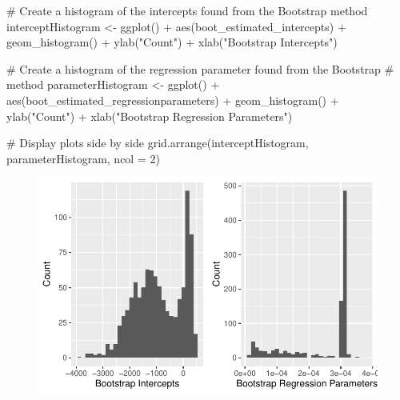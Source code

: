 \documentclass[
  letterpaper,
  DIV=11,
  numbers=noendperiod]{scrartcl}
\newenvironment{Shaded}{\begin{snugshade}}{\end{snugshade}}
\newcommand{\AttributeTok}[1]{\textcolor[rgb]{0.40,0.45,0.13}{#1}}
\newcommand{\CommentTok}[1]{\textcolor[rgb]{0.37,0.37,0.37}{#1}}
\newcommand{\DecValTok}[1]{\textcolor[rgb]{0.68,0.00,0.00}{#1}}
\newcommand{\FunctionTok}[1]{\textcolor[rgb]{0.28,0.35,0.67}{#1}}
\newcommand{\NormalTok}[1]{\textcolor[rgb]{0.00,0.23,0.31}{#1}}
\newcommand{\OtherTok}[1]{\textcolor[rgb]{0.00,0.23,0.31}{#1}}
\newcommand{\SpecialCharTok}[1]{\textcolor[rgb]{0.37,0.37,0.37}{#1}}
\newcommand{\StringTok}[1]{\textcolor[rgb]{0.13,0.47,0.30}{#1}}
\begin{document}
\begin{Shaded}
\begin{Highlighting}[]
\CommentTok{\# Create a histogram of the intercepts found from the Bootstrap method}
\NormalTok{interceptHistogram }\OtherTok{\textless{}{-}} \FunctionTok{ggplot}\NormalTok{() }\SpecialCharTok{+} 
                      \FunctionTok{aes}\NormalTok{(boot\_estimated\_intercepts) }\SpecialCharTok{+}
                      \FunctionTok{geom\_histogram}\NormalTok{() }\SpecialCharTok{+}
                      \FunctionTok{ylab}\NormalTok{(}\StringTok{"Count"}\NormalTok{) }\SpecialCharTok{+}
                      \FunctionTok{xlab}\NormalTok{(}\StringTok{"Bootstrap Intercepts"}\NormalTok{)}

\CommentTok{\# Create a histogram of the regression parameter found from the Bootstrap }
\CommentTok{\# method}
\NormalTok{parameterHistogram }\OtherTok{\textless{}{-}} \FunctionTok{ggplot}\NormalTok{() }\SpecialCharTok{+} 
                      \FunctionTok{aes}\NormalTok{(boot\_estimated\_regressionparameters) }\SpecialCharTok{+}
                      \FunctionTok{geom\_histogram}\NormalTok{() }\SpecialCharTok{+}
                      \FunctionTok{ylab}\NormalTok{(}\StringTok{"Count"}\NormalTok{) }\SpecialCharTok{+}
                      \FunctionTok{xlab}\NormalTok{(}\StringTok{"Bootstrap Regression Parameters"}\NormalTok{)}

\CommentTok{\# Display plots side by side}
\FunctionTok{grid.arrange}\NormalTok{(interceptHistogram, parameterHistogram, }\AttributeTok{ncol =} \DecValTok{2}\NormalTok{)}
\end{Highlighting}
\end{Shaded}

\begin{figure}[H]

{\centering \includegraphics{Bootstrapping-Group-Report_files/figure-pdf/unnamed-chunk-26-1.pdf}

}

\end{figure}
\end{document}
